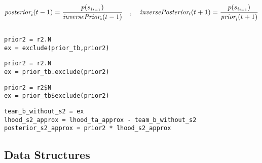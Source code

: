 \documentclass[article]{jss}
\newif\ifen
\newif\ifes
\newcommand{\en}[1]{\ifen#1\fi}
\newcommand{\es}[1]{\ifes#1\fi}
\begin{document}
\es{Los mensajes que no est\'an todav\'ia definidos, por ejemplo el prior inverso en la primer pasada hacia adelante, es remplazado por una forma neutral como un escalar unidad o una distribuci\'on gausiana con infinita varianza.}
%
\en{Finally, the messages that the variable $s_{i_t}$ sends to the past and the future are,}
\es{Finalmente, los mensajes que la variable $s_{i_t}$ envía al pasado y al futuro son,}
%
\begin{equation*}
  \emph{posterior}_i(t-1) = \frac{p(s_{i_{t-1}})}{\emph{inversePrior}_i(t-1)} \ \ \ , \ \ \ \emph{inversePosterior}_i(t+1) = \frac{p(s_{i_{t+1}})}{\emph{prior}_i(t+1)}
\end{equation*}



%

\begin{lstlisting}[backgroundcolor=\color
{white},label=lst:posterior_s2_approx, caption=\relax, belowskip=-1.0 \baselineskip, aboveskip=-0 \baselineskip]
\end{lstlisting}
\begin{paracol}{3}
\begin{lstlisting}[backgroundcolor=\color{julia},belowskip=-0.77 \baselineskip]
prior2 = r2.N
ex = exclude(prior_tb,prior2)
\end{lstlisting}
\switchcolumn
\begin{lstlisting}[backgroundcolor=\color{python},belowskip=-0.77 \baselineskip]
prior2 = r2.N
ex = prior_tb.exclude(prior2)
\end{lstlisting}
\switchcolumn
\begin{lstlisting}[backgroundcolor=\color{r},belowskip=-0.77 \baselineskip]
prior2 = r2$N
ex = prior_tb$exclude(prior2)
\end{lstlisting}
\end{paracol}
\begin{lstlisting}[backgroundcolor=\color{all}]
team_b_without_s2 = ex
lhood_s2_approx = lhood_ta_approx - team_b_without_s2 
posterior_s2_approx = prior2 * lhood_s2_approx 
\end{lstlisting}

\en{At each forward pass we store each forward message, i.e. \emph{prior}$_i(t+1)$.}
\es{En cada pasada hacia adelante, guardamos cada mensaje hacia adelante, i.e. \emph{prior}$_i(t+1)$.}
%
\en{And at each backward pass we compute the backward message, i.e. \emph{inversePrior}$_i(t-1)$.}
\es{En cada pasada hacia atr\'as computamos el mensaje hacia atr\'as, i.e. \emph{inversePrior}$_i(t-1)$.}
%
\subsection{Data Structures} \label{sec:estructuras} 
\end{document}
